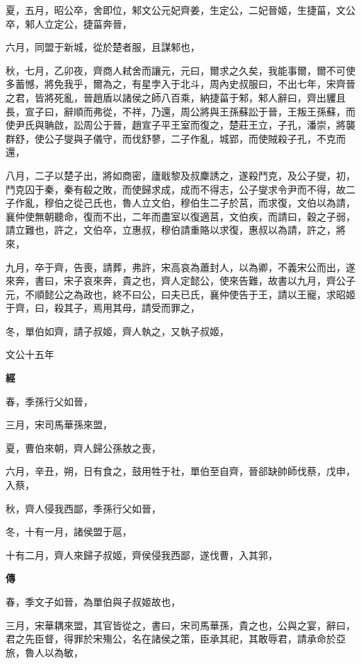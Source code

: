 \documentclass{ctexart}
\begin{document}
夏，五月，昭公卒，舍即位，邾文公元妃齊姜，生定公，二妃晉姬，生捷菑，文公卒，邾人立定公，捷菑奔晉，

六月，同盟于新城，從於楚者服，且謀邾也，

秋，七月，乙卯夜，齊商人弒舍而讓元，元曰，爾求之久矣，我能事爾，爾不可使多蓄憾，將免我乎，爾為之，有星孛入于北斗，周內史叔服曰，不出七年，宋齊晉之君，皆將死亂，晉趙盾以諸侯之師八百乘，納捷菑于邾，邾人辭曰，齊出貜且長，宣子曰，辭順而弗從，不祥，乃還，周公將與王孫蘇訟于晉，王叛王孫蘇，而使尹氏與聃啟，訟周公于晉，趙宣子平王室而復之，楚莊王立，子孔，潘崇，將襲群舒，使公子燮與子儀守，而伐舒蓼，二子作亂，城郢，而使賊殺子孔，不克而還，

八月，二子以楚子出，將如商密，廬戢黎及叔麇誘之，遂殺鬥克，及公子燮，初，鬥克囚于秦，秦有殽之敗，而使歸求成，成而不得志，公子燮求令尹而不得，故二子作亂，穆伯之從己氏也，魯人立文伯，穆伯生二子於莒，而求復，文伯以為請，襄仲使無朝聽命，復而不出，二年而盡室以復適莒，文伯疾，而請曰，穀之子弱，請立難也，許之，文伯卒，立惠叔，穆伯請重賂以求復，惠叔以為請，許之，將來，

九月，卒于齊，告喪，請葬，弗許，宋高哀為蕭封人，以為卿，不義宋公而出，遂來奔，書曰，宋子哀來奔，貴之也，齊人定懿公，使來告難，故書以九月，齊公子元，不順懿公之為政也，終不曰公，曰夫已氏，襄仲使告于王，請以王寵，求昭姬于齊，曰，殺其子，焉用其母，請受而罪之，

冬，單伯如齊，請子叔姬，齊人執之，又執子叔姬，





文公十五年


\textbf{經}



春，季孫行父如晉，

三月，宋司馬華孫來盟，

夏，曹伯來朝，齊人歸公孫敖之喪，

六月，辛丑，朔，日有食之，鼓用牲于社，單伯至自齊，晉郤缺帥師伐蔡，戊申，入蔡，

秋，齊人侵我西鄙，季孫行父如晉，

冬，十有一月，諸侯盟于扈，

十有二月，齊人來歸子叔姬，齊侯侵我西鄙，遂伐曹，入其郛，

\textbf{傳}



春，季文子如晉，為單伯與子叔姬故也，

三月，宋華耦來盟，其官皆從之，書曰，宋司馬華孫，貴之也，公與之宴，辭曰，君之先臣督，得罪於宋殤公，名在諸侯之策，臣承其祀，其敢辱君，請承命於亞旅，魯人以為敏，
\end{document}
